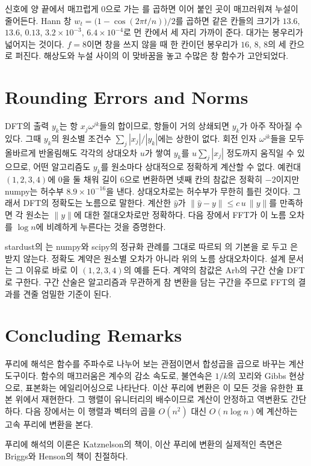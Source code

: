 신호에 양 끝에서 매끄럽게 $0$으로 가는 를 곱하면 이어 붙인 곳이 매끄러워져 누설이 줄어든다. Hann 창 $w_t=\bigl(1-\cos(2\pi t/n)\bigr)/2$를 곱하면 같은 칸들의 크기가 $13.6$, $13.6$, $0.13$, $3.2\times10^{-3}$, $6.4\times10^{-4}$로 먼 칸에서 세 자리 가까이 준다. 대가는 봉우리가 넓어지는 것이다. $f=8$이면 창을 쓰지 않을 때 한 칸이던 봉우리가 $16$, $8$, $8$의 세 칸으로 퍼진다. 해상도와 누설 사이의 이 맞바꿈을 놓고 수많은 창 함수가 고안되었다\cite{harris1978}.

\section{Rounding Errors and Norms}
\label{sec:dft-rounding}

DFT의 출력 $y_k$는 항 $x_j\omega^{jk}$들의 합이므로, 항들이 거의 상쇄되면 $y_k$가 아주 작아질 수 있다. 그때 $y_k$의 원소별 조건수 $\sum_j|x_j|/|y_k|$에는 상한이 없다. 회전 인자 $\omega^{jk}$들을 모두 올바르게 반올림해도 각각의 상대오차 $u$가 쌓여 $y_k$를 $u\sum_j|x_j|$ 정도까지 움직일 수 있으므로, 어떤 알고리즘도 $y_k$를 원소마다 상대적으로 정확하게 계산할 수 없다. 예컨대 $(1,2,3,4)$에 $0$을 둘 채워 길이 $6$으로 변환하면 넷째 칸의 참값은 정확히 $-2$이지만 numpy는 허수부 $8.9\times10^{-16}$을 낸다. 상대오차로는 허수부가 무한히 틀린 것이다. 그래서 DFT의 정확도는 노름으로 말한다. 계산한 $\hat y$가 $\|\hat y-y\|\le c\,u\,\|y\|$를 만족하면 각 원소는 $\|y\|$에 대한 절대오차로만 정확하다. 다음 장에서 FFT가 이 노름 오차를 $\log n$에 비례하게 누른다는 것을 증명한다.

\begin{instardust}
stardust의 는 numpy와 scipy의 정규화 관례를 그대로 따르되 의 기본을 로 두고 은 받지 않는다. 정확도 계약은 원소별 오차가 아니라 위의 노름 상대오차이다. 설계 문서는 그 이유로 바로 이 $(1,2,3,4)$의 예를 든다. 계약의 참값은 Arb의 구간 산술 DFT로 구한다. 구간 산술은 알고리즘과 무관하게 참 변환을 담는 구간을 주므로 FFT의 결과를 견줄 엄밀한 기준이 된다.
\end{instardust}

\section{Concluding Remarks}

푸리에 해석은 함수를 주파수로 나누어 보는 관점이면서 합성곱을 곱으로 바꾸는 계산 도구이다. 함수의 매끄러움은 계수의 감소 속도로, 불연속은 $1/k$의 꼬리와 Gibbs 현상으로, 표본화는 에일리어싱으로 나타난다. 이산 푸리에 변환은 이 모든 것을 유한한 표본 위에서 재현한다. 그 행렬이 유니터리의 배수이므로 계산이 안정하고 역변환도 간단하다. 다음 장에서는 이 행렬과 벡터의 곱을 $O(n^2)$ 대신 $O(n\log n)$에 계산하는 고속 푸리에 변환을 본다.

푸리에 해석의 이론은 Katznelson의 책\cite{katznelson2004}이, 이산 푸리에 변환의 실제적인 측면은 Briggs와 Henson의 책\cite{briggs1995}이 친절하다.

\chapterreferences
